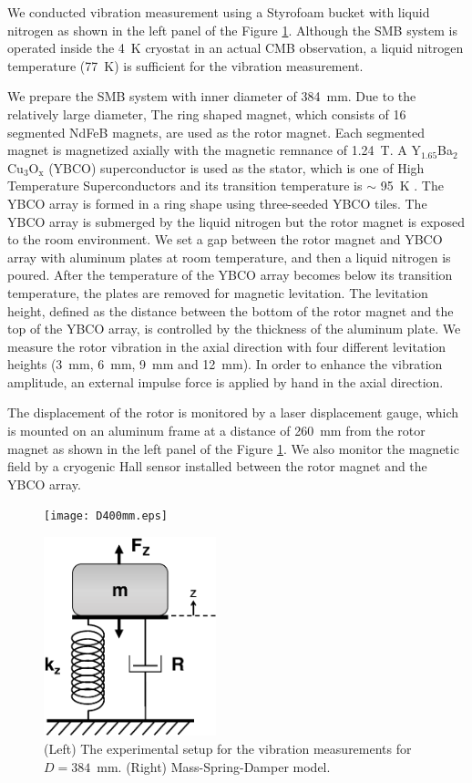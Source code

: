 \documentclass[a4paper]{jpconf}
\begin{document}
We conducted vibration measurement using a Styrofoam bucket with liquid nitrogen as shown in the left panel of the Figure \ref{fig:d400}.
Although the SMB system is operated inside the 4~K cryostat in an actual CMB observation, a liquid nitrogen temperature (77~K) is sufficient for the vibration measurement.

We prepare the SMB system with inner diameter of 384~mm.
Due to the relatively large diameter, The ring shaped magnet, which consists of 16 segmented NdFeB magnets, are used as the rotor magnet.
Each segmented magnet is magnetized axially with the magnetic remnance of 1.24~T.
A Y$_{1.65}$Ba$_{2}$Cu$_{3}$O$_{\mathrm{x}}$ (YBCO) superconductor is used as the stator, which is one of High Temperature Superconductors and its transition temperature is $\sim$ 95~K \cite{Hull}.
The YBCO array is formed in a ring shape using three-seeded YBCO tiles.
The YBCO array is submerged by the liquid nitrogen but the rotor magnet is exposed to the room environment.
We set a gap between the rotor magnet and YBCO array with aluminum plates at room temperature, and then a liquid nitrogen is poured.
After the temperature of the YBCO array becomes below its transition temperature, the plates are removed for magnetic levitation.
The levitation height, defined as the distance between the bottom of the rotor magnet and the top of the YBCO array, is controlled by the thickness of the aluminum plate.
We measure the rotor vibration in the axial direction with four different levitation heights (3~mm, 6~mm, 9~mm and 12~mm).
In order to enhance the vibration amplitude, an external impulse force is applied by hand in the axial direction.

The displacement of the rotor is monitored by a laser displacement gauge,
which is mounted on an aluminum frame at a distance of 260~mm from the rotor magnet as shown in the left panel of the Figure \ref{fig:d400}.
We also monitor the magnetic field by a cryogenic Hall sensor installed between the rotor magnet and the YBCO array.

\begin{figure}[htbp]
  \centering
  \begin{minipage}{0.6\hsize}
    \texttt{[image: D400mm.eps]}
  \end{minipage}
  \begin{minipage}{0.3\hsize}
    \centering
    \includegraphics[width=50mm]{SpringSystem.eps}
  \end{minipage}
  \caption{(Left) The experimental setup for the vibration measurements for $D=384$~mm. (Right) Mass-Spring-Damper model.}
  \label{fig:d400}
\end{figure}
\end{document}
